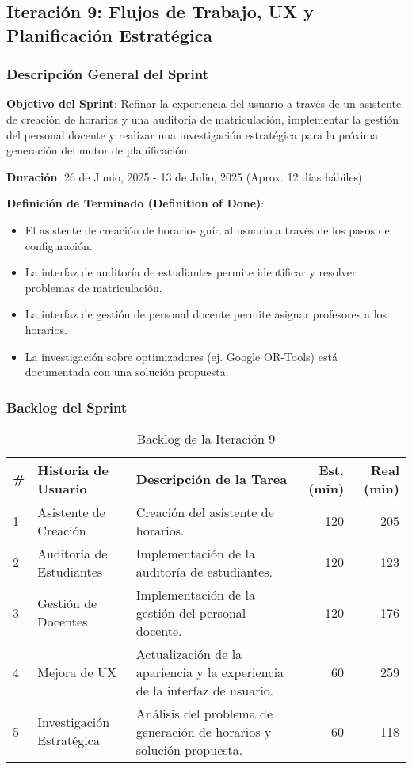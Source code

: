 \subsection{Iteración 9: Flujos de Trabajo, UX y Planificación Estratégica}

\subsubsection{Descripción General del Sprint}

\textbf{Objetivo del Sprint}: Refinar la experiencia del usuario a través de un asistente de creación de horarios y una auditoría de matriculación, implementar la gestión del personal docente y realizar una investigación estratégica para la próxima generación del motor de planificación.

\textbf{Duración}: 26 de Junio, 2025 - 13 de Julio, 2025 (Aprox. 12 días hábiles)

\textbf{Definición de Terminado (Definition of Done)}: 
\begin{itemize}
    \item El asistente de creación de horarios guía al usuario a través de los pasos de configuración.
    \item La interfaz de auditoría de estudiantes permite identificar y resolver problemas de matriculación.
    \item La interfaz de gestión de personal docente permite asignar profesores a los horarios.
    \item La investigación sobre optimizadores (ej. Google OR-Tools) está documentada con una solución propuesta.
\end{itemize}

\subsubsection{Backlog del Sprint}

\begin{table}[H]
\caption{Backlog de la Iteración 9}
\label{tab:iteration-9-backlog}
\begin{tabularx}{\textwidth}{@{}llXrr@{}}
\toprule
\textbf{\#} & \textbf{Historia de Usuario} & \textbf{Descripción de la Tarea} & \textbf{Est. (min)} & \textbf{Real (min)} \\
\midrule
    1 & Asistente de Creación & Creación del asistente de horarios. & 120 & 205 \\
    2 & Auditoría de Estudiantes & Implementación de la auditoría de estudiantes. & 120 & 123 \\
    3 & Gestión de Docentes & Implementación de la gestión del personal docente. & 120 & 176 \\
    4 & Mejora de UX & Actualización de la apariencia y la experiencia de la interfaz de usuario. & 60 & 259 \\
    5 & Investigación Estratégica & Análisis del problema de generación de horarios y solución propuesta. & 60 & 118 \\
\bottomrule
\end{tabularx}
\end{table}

